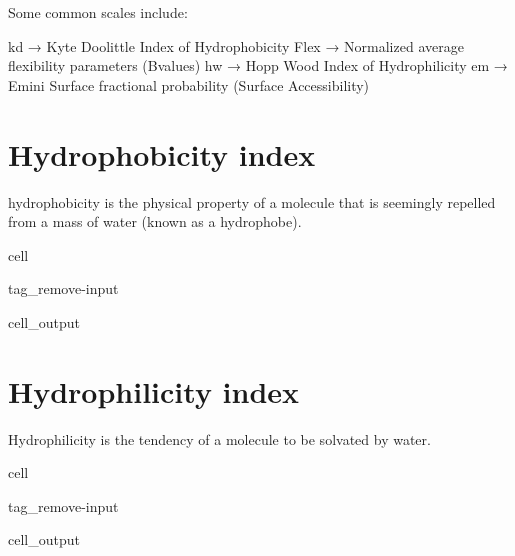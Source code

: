 \documentclass[letterpaper,10pt,english]{jupyterBook}
\begin{document}
\sphinxAtStartPar
Some common scales include:

\begin{sphinxVerbatim}[commandchars=\\\{\}]
\PYGZhy{} kd → Kyte \PYGZam{} Doolittle Index of Hydrophobicity
\PYGZhy{} Flex → Normalized average flexibility parameters (B\PYGZhy{}values)
\PYGZhy{} hw → Hopp \PYGZam{} Wood Index of Hydrophilicity
\PYGZhy{} em → Emini Surface fractional probability (Surface Accessibility)
\end{sphinxVerbatim}


\section{Hydrophobicity index}
\label{\detokenize{ipynb/chapter2:hydrophobicity-index}}
\sphinxAtStartPar
hydrophobicity is the physical property of a molecule that is seemingly repelled from a mass of water (known as a hydrophobe).

\begin{sphinxuseclass}{cell}
\begin{sphinxuseclass}{tag_remove-input}\begin{sphinxVerbatimOutput}

\begin{sphinxuseclass}{cell_output}
\noindent{}

\end{sphinxuseclass}\end{sphinxVerbatimOutput}

\end{sphinxuseclass}
\end{sphinxuseclass}

\section{Hydrophilicity index}
\label{\detokenize{ipynb/chapter2:hydrophilicity-index}}
\sphinxAtStartPar
Hydrophilicity is the tendency of a molecule to be solvated by water.

\begin{sphinxuseclass}{cell}
\begin{sphinxuseclass}{tag_remove-input}\begin{sphinxVerbatimOutput}

\begin{sphinxuseclass}{cell_output}
\noindent{}

\end{sphinxuseclass}\end{sphinxVerbatimOutput}

\end{sphinxuseclass}
\end{sphinxuseclass}
\end{document}
